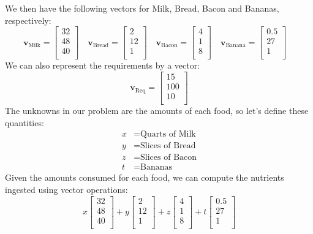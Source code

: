 \documentclass[12pt]{article}
\begin{document}
We then have the following vectors for Milk, Bread, Bacon and Bananas, respectively:
$$
\mathbf{v}_{\text{Milk}}=\left[\begin{matrix} 32  \\ 48 \\ 40 \\ \end{matrix}\right]\quad
\mathbf{v}_{\text{Bread}}=\left[\begin{matrix}  2  \\ 12 \\  1 \\ \end{matrix}\right]\quad
\mathbf{v}_{\text{Bacon}}=\left[\begin{matrix}  4  \\  1 \\  8 \\ \end{matrix}\right]\quad
\mathbf{v}_{\text{Banana}}=\left[\begin{matrix} 0.5 \\ 27 \\  1 \\ \end{matrix}\right]\quad
$$
We can also represent the requirements by a vector:
\[
\mathbf{v}_{\text{Req}}=\left[\begin{matrix} 15  \\ 100 \\ 10 \\ \end{matrix}\right]
\]
The unknowns in our problem are the amounts of each food, so let's define these quantities:
\begin{align*}
x &= \text{Quarts of Milk}\\
y &= \text{Slices of Bread}\\
z &= \text{Slices of Bacon}\\
t &= \text{Bananas}
\end{align*}
Given the amounts consumed for each food, we can compute the nutrients ingested using vector operations:
\[
x\left[\begin{matrix} 32  \\ 48 \\ 40 \\ \end{matrix}\right]+
y\left[\begin{matrix}  2  \\ 12 \\  1 \\ \end{matrix}\right]+
z\left[\begin{matrix}  4  \\  1 \\  8 \\ \end{matrix}\right]+
t\left[\begin{matrix} 0.5 \\ 27 \\  1 \\ \end{matrix}\right]
\]
\end{document}
